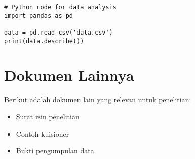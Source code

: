 \begin{verbatim}
# Python code for data analysis
import pandas as pd

data = pd.read_csv('data.csv')
print(data.describe())
\end{verbatim}

\section*{Dokumen Lainnya}
Berikut adalah dokumen lain yang relevan untuk penelitian:
\begin{itemize}
    \item Surat izin penelitian
    \item Contoh kuisioner
    \item Bukti pengumpulan data
\end{itemize}



